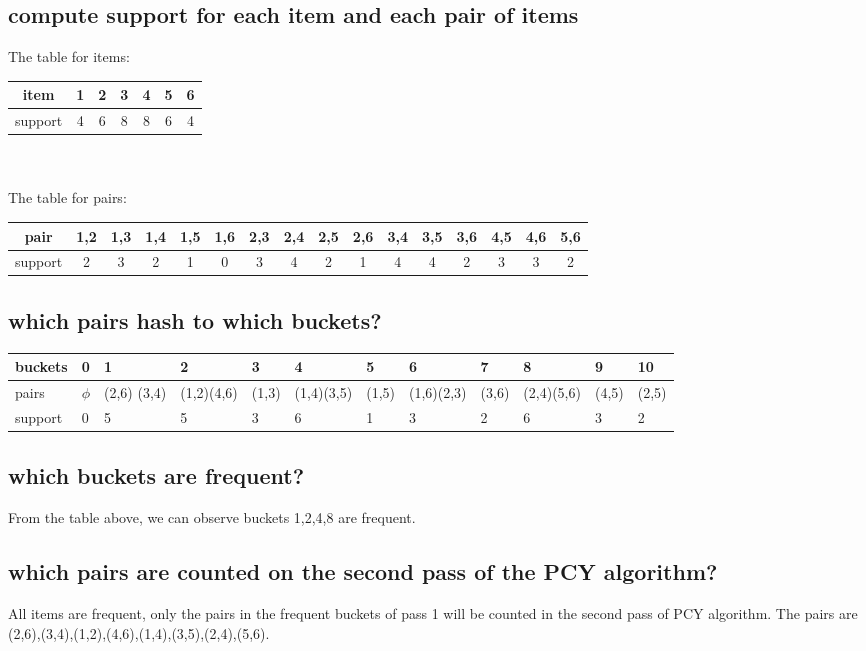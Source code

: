 \documentclass[paper=a4, fontsize=13pt]{article} %
\begin{document}
\subsection{compute support for each item and each pair of items}
The table for items:\\
\begin{tabular}{|c|c|c|c|c|c|c|}
\hline 
item & 1 & 2 & 3 & 4 & 5 & 6 \\ 
\hline 
support & 4 & 6 & 8 & 8 & 6 & 4 \\ 
\hline 
\end{tabular} 
\\
\\
The table for pairs:\\
\begin{tabular}{|c|c|c|c|c|c|c|c|c|c|c|c|c|c|c|c|}
\hline 
pair & 1,2 & 1,3 & 1,4 & 1,5 & 1,6 & 2,3 & 2,4 & 2,5 & 2,6 & 3,4 & 3,5 & 3,6 & 4,5 & 4,6 & 5,6 \\ 
\hline 
support & 2 & 3 & 2 & 1 & 0 & 3 & 4 & 2 & 1 & 4 & 4 & 2 & 3 & 3 & 2 \\ 
\hline 
\end{tabular} 

\subsection{which pairs hash to which buckets?}
\begin{tabularx}{1\textwidth}{|X|X|X|X|X|X|X|X|X|X|X|X|}
\hline 
buckets & 0 & 1 & 2 & 3 & 4 & 5 & 6 & 7 & 8 & 9 & 10 \\ 
\hline 
pairs & $\phi$ & (2,6) \newline (3,4) & (1,2)\newline(4,6) & (1,3) & (1,4)\newline(3,5) & (1,5) & (1,6)\newline(2,3) & (3,6) & (2,4)\newline(5,6) & (4,5) & (2,5) \\ 
\hline 
support & 0 & 5 & 5 & 3 & 6 & 1 & 3 & 2 & 6 & 3 & 2 \\ 
\hline
\end{tabularx} 

\subsection{which buckets are frequent?}
From the table above, we can observe buckets 1,2,4,8 are frequent.

\subsection{which pairs are counted on the second pass of the PCY algorithm?}
All items are frequent, only the pairs in the frequent buckets of pass 1 will be counted in the second pass of PCY algorithm.
The pairs are (2,6),(3,4),(1,2),(4,6),(1,4),(3,5),(2,4),(5,6).
\end{document}
